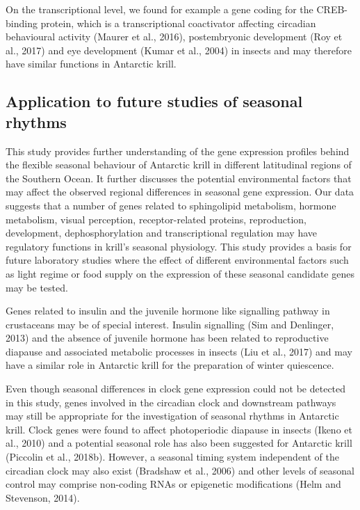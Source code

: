 On the transcriptional level, we found for example a gene coding for the CREB-binding protein, which is a transcriptional coactivator affecting circadian behavioural activity (Maurer et al., 2016), postembryonic development (Roy et al., 2017) and eye development (Kumar et al., 2004) in insects and may therefore have similar functions in Antarctic krill.

\subsection{Application to future studies of seasonal rhythms}

This study provides further understanding of the gene expression profiles behind the flexible seasonal behaviour of Antarctic krill in different latitudinal regions of the Southern Ocean. It further discusses the potential environmental factors that may affect the observed regional differences in seasonal gene expression. Our data suggests that a number of genes related to sphingolipid metabolism, hormone metabolism, visual perception, receptor-related proteins, reproduction, development, dephosphorylation and transcriptional regulation may have regulatory functions in krill's seasonal physiology. This study provides a basis for future laboratory studies where the effect of different environmental factors such as light regime or food supply on the expression of these seasonal candidate genes may be tested. 

Genes related to insulin and the juvenile hormone like signalling pathway in crustaceans may be of special interest. Insulin signalling (Sim and Denlinger, 2013) and the absence of juvenile hormone has been related to reproductive diapause and associated metabolic processes in insects (Liu et al., 2017) and may have a similar role in Antarctic krill for the preparation of winter quiescence.

Even though seasonal differences in clock gene expression could not be detected in this study, genes involved in the circadian clock and downstream pathways may still be appropriate for the investigation of seasonal rhythms in Antarctic krill. Clock genes were found to affect photoperiodic diapause in insects (Ikeno et al., 2010) and a potential seasonal role has also been suggested for Antarctic krill (Piccolin et al., 2018b). However, a seasonal timing system independent of the circadian clock may also exist (Bradshaw et al., 2006) and other levels of seasonal control may comprise non-coding RNAs or epigenetic modifications (Helm and Stevenson, 2014).

